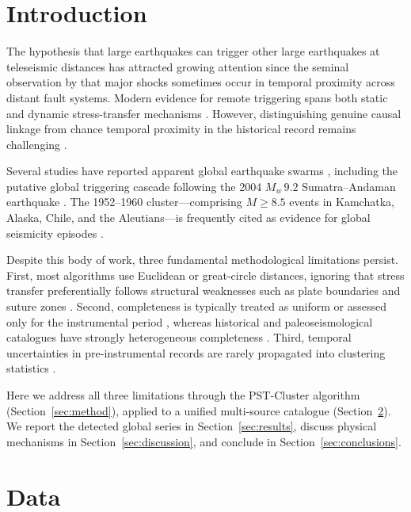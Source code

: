 \documentclass[draft]{agujournal2019}
\begin{document}
\section{Introduction}

The hypothesis that large earthquakes can trigger other large earthquakes at
teleseismic distances has attracted growing attention since the seminal
observation by \citet{Richter1958} that major shocks sometimes occur in
temporal proximity across distant fault systems.  Modern evidence for
remote triggering spans both static and dynamic stress-transfer mechanisms
\citep{King1994, Hill1993, Brodsky2006}.  However, distinguishing genuine
causal linkage from chance temporal proximity in the historical record remains
challenging \citep{Kagan1991, Michael2011}.

Several studies have reported apparent global earthquake swarms
\citep{Bufe1994, Gonzalez2012}, including the putative global triggering
cascade following the 2004 $M_w\,9.2$ Sumatra–Andaman earthquake
\citep{Pollitz2012, Parsons2014}.  The 1952–1960 cluster—comprising
$M \geq 8.5$ events in Kamchatka, Alaska, Chile, and the Aleutians—is
frequently cited as evidence for global seismicity episodes
\citep{Utsu1970, Kagan2004}.

Despite this body of work, three fundamental methodological limitations
persist.  First, most algorithms use Euclidean or great-circle distances,
ignoring that stress transfer preferentially follows structural weaknesses
such as plate boundaries and suture zones \citep{Bird2003, Zhu2022}.
Second, completeness is typically treated as uniform or assessed only for
the instrumental period \citep{Wiemer2000, Woessner2005}, whereas historical
and paleoseismological catalogues have strongly heterogeneous completeness
\citep{Ambraseys1994, Guidoboni2005}.  Third, temporal uncertainties in
pre-instrumental records are rarely propagated into clustering statistics
\citep{Gasperini2013}.

Here we address all three limitations through the PST-Cluster algorithm
(Section~\ref{sec:method}), applied to a unified multi-source catalogue
(Section~\ref{sec:data}).  We report the detected global series in
Section~\ref{sec:results}, discuss physical mechanisms in
Section~\ref{sec:discussion}, and conclude in Section~\ref{sec:conclusions}.

\section{Data}
\label{sec:data}
\end{document}
